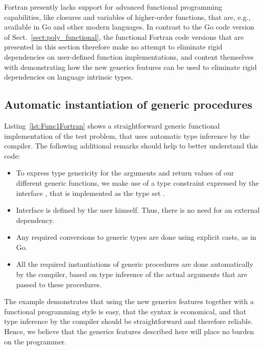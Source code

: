 \documentclass[11pt,oneside]{report}
\newcommand{\code}[1]{{\selectfont\ttfamily{#1}}}
\begin{document}
Fortran presently lacks support for advanced functional programming
capabilities, like closures and variables of higher-order functions,
that are, e.g., available in Go and other modern languages. In
contrast to the Go code version of Sect.~\ref{sect:poly_functional},
the functional Fortran code versions that are presented in this
section therefore make no attempt to eliminate rigid dependencies on
user-defined function implementations, and content themselves with
demonstrating how the new generics features can be used to eliminate
rigid dependencies on language intrinsic types.

\subsection{Automatic instantiation of generic procedures}

Listing~\ref{lst:Func1Fortran} shows a straightforward generic
functional implementation of the test problem, that uses automatic
type inference by the compiler. The following additional remarks
should help to better understand this code:
\begin{itemize}
\item
  To express type genericity for the arguments and return values of our
  different generic functions, we make use of a type constraint
  expressed by the interface \code{INumeric}, that is implemented as the
  type set \code{integer | real(real64)}.
\item
  Interface \code{INumeric} is defined by the user himself. Thus,
  there is no need for an external dependency.
\item
  Any required conversions to generic types are done using explicit
  casts, as in Go.
\item
  All the required instantiations of generic procedures are done
  automatically by the compiler, based on type inference of the
  actual arguments that are passed to these procedures.
\end{itemize}



The example demonstrates that using the new generics features together
with a functional programming style is easy, that the syntax is
economical, and that type inference by the compiler should be
straightforward and therefore reliable. Hence, we believe that the
generics features described here will place no burden on the
programmer.
\end{document}
